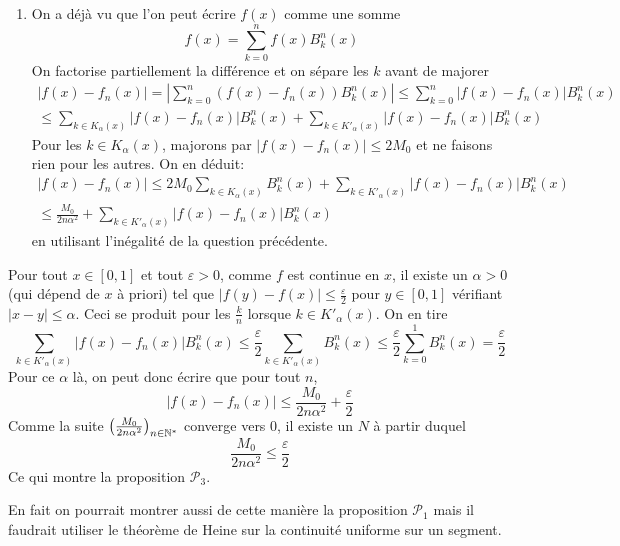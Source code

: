 \begin{enumerate}
\begin{enumerate}
 \item On a déjà vu que l'on peut écrire $f(x)$ comme une somme
\begin{displaymath}
 f(x) = \sum_{k=0}^nf(x)B^n_k(x)
\end{displaymath}
On factorise partiellement la différence et on sépare les $k$ avant de majorer
\begin{multline*}
 \left| f(x)-f_n(x)\right|
= \left| \sum_{k=0}^n\left(f(x) -f_n(x) \right) B^n_k(x)\right|
\leq  \sum_{k=0}^n\left|f(x) -f_n(x) \right| B^n_k(x)\\
\leq  \sum_{k\in K_\alpha(x)}\left|f(x) -f_n(x) \right| B^n_k(x)
+ \sum_{k\in K'_\alpha(x)}\left|f(x) -f_n(x) \right| B^n_k(x)
\end{multline*}
Pour les $k\in K_\alpha(x)$, majorons par $\left|f(x) -f_n(x) \right|\leq 2M_0$ et ne faisons rien pour les autres.  On en déduit:
\begin{multline*}
\left| f(x)-f_n(x)\right| 
\leq  2M_0\sum_{k\in K_\alpha(x)} B^n_k(x) + \sum_{k\in K'_\alpha(x)}\left|f(x) -f_n(x) \right| B^n_k(x)\\
\leq \frac{M_0}{2n\alpha^2} + \sum_{k\in K'_\alpha(x)}\left|f(x) -f_n(x) \right| B^n_k(x)
\end{multline*}
en utilisant l'inégalité de la question précédente.
\end{enumerate}
Pour tout $x\in [0,1]$ et tout $\varepsilon>0$, comme $f$ est continue en $x$, il existe un $\alpha>0$ (qui dépend de $x$ à priori) tel que $\left|f(y)-f(x)\right|\leq \frac{\varepsilon}{2}$ pour $y\in[0,1]$ vérifiant $|x-y|\leq \alpha$. Ceci se produit pour les $\frac{k}{n}$ lorsque $k\in K'_\alpha(x)$. On en tire
\begin{displaymath}
 \sum_{k\in K'_\alpha(x)}\left|f(x) -f_n(x) \right| B^n_k(x)
\leq \frac{\varepsilon}{2} \sum_{k\in K'_\alpha(x)} B^n_k(x)
\leq \frac{\varepsilon}{2} \sum_{k=0}^1 B^n_k(x) = \frac{\varepsilon}{2}
\end{displaymath}
Pour ce $\alpha$ là, on peut donc écrire que pour tout $n$,
\begin{displaymath}
 \left| f(x)-f_n(x)\right| \leq \frac{M_0}{2n\alpha^2} + \frac{\varepsilon}{2}
\end{displaymath}
Comme la suite $\left( \frac{M_0}{2n\alpha^2}\right) _{n\in \mathbb{N}^*}$ converge vers $0$, il existe un $N$ à partir duquel 
\begin{displaymath}
 \frac{M_0}{2n\alpha^2} \leq \frac{\varepsilon}{2}
\end{displaymath}
 Ce qui montre la proposition $\mathcal{P}_3$.

En fait on pourrait montrer aussi de cette manière la proposition $\mathcal{P}_1$ mais il faudrait utiliser le théorème de Heine sur la continuité uniforme sur un segment. 
\end{enumerate}
